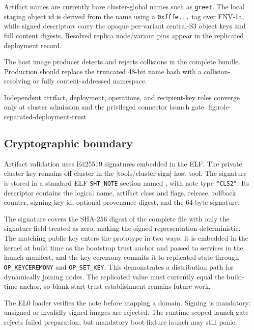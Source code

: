 Artifact names are currently bare cluster-global names such as
\texttt{greet}. The local staging object id is derived from the name using a
\texttt{0xfffe...} tag over FNV-1a, while signed descriptors carry the opaque
per-variant central-S3 object keys and full content digests. Resolved replica
node/variant pins appear in the replicated deployment record.

The host image producer detects and rejects collisions in the complete
bundle. Production should replace the truncated 48-bit name hash with a
collision-resolving or fully content-addressed namespace.

    {Independent artifact, deployment, operations, and recipient-key roles
    converge only at cluster admission and the privileged connector launch
    gate.}
    {fig:role-separated-deployment-trust}

\subsection{Cryptographic boundary}

Artifact validation uses Ed25519 signatures embedded in the ELF. The private
cluster key remains off-cluster in the
\repodir|tools/cluster-sign| host tool. The signature is stored in a standard
ELF \texttt{SHT\_NOTE} section named
, with note type \texttt{"CLS2"}. Its descriptor
contains the logical name, artifact class and flags, release, rollback
counter, signing-key id, optional provenance digest, and the 64-byte
signature.

The signature covers the SHA-256 digest of the complete file with only the
signature field treated as zero, making the signed representation
deterministic. The matching public key enters the prototype in two ways: it
is embedded in the kernel at build time as the bootstrap trust anchor and
passed to services in the launch manifest, and the key ceremony commits it
to replicated state through
\texttt{OP\_KEYCEREMONY} and \texttt{OP\_SET\_KEY}. This demonstrates a
distribution path for dynamically joining nodes. The replicated value must
currently equal the build-time anchor, so blank-start trust establishment remains
future work.

The EL0 loader verifies the note before mapping a domain. Signing is
mandatory: unsigned or invalidly signed images are rejected. The
runtime scoped launch gate rejects failed preparation, but mandatory boot-fixture
launch may still panic.

